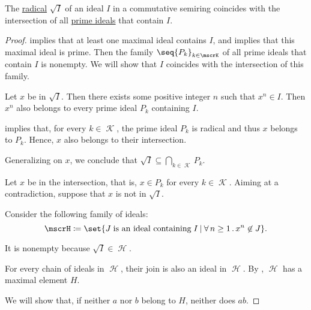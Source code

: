 \begin{proposition}\label{thm:radical_ideal_is_intersection}
  The \hyperref[def:radical_of_ideal]{radical} \( \sqrt I \) of an ideal \( I \) in a commutative semiring coincides with the intersection of all \hyperref[def:semiring_ideal/prime]{prime ideals} that contain \( I \).
\end{proposition}
\begin{proof}
    implies that at least one maximal ideal contains \( I \), and  implies that this maximal ideal is prime. Then the family \( \seq{ P_k }_{k \in \mscrK} \) of all prime ideals that contain \( I \) is nonempty. We will show that \( I \) coincides with the intersection of this family.

   Let \( x \) be in \( \sqrt I \). Then there exists some positive integer \( n \) such that \( x^n \in I \). Then \( x^n \) also belongs to every prime ideal \( P_k \) containing \( I \).

   implies that, for every \( k \in \mscrK \), the prime ideal \( P_k \) is radical and thus \( x \) belongs to \( P_k \). Hence, \( x \) also belongs to their intersection.

  Generalizing on \( x \), we conclude that \( \sqrt I \subseteq \bigcap_{k \in \mscrK} P_k \).

   Let \( x \) be in the intersection, that is, \( x \in P_k \) for every \( k \in \mscrK \). Aiming at a contradiction, suppose that \( x \) is not in \( \sqrt I \).

  Consider the following family of ideals:
  \begin{equation*}
    \mscrH \coloneqq \set{ J \T{is an ideal containing} I \given \qforall {n \geq 1} x^n \not\in J }.
  \end{equation*}

  It is nonempty because \( \sqrt I \in \mscrH \).

  For every chain of ideals in \( \mscrH \), their join is also an ideal in \( \mscrH \). By , \( \mscrH \) has a maximal element \( H \).

   We will show that, if neither \( a \) nor \( b \) belong to \( H \), neither does \( ab \).


\end{proof}
